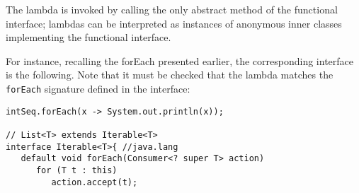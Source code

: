 The lambda is invoked by calling the only abstract method
of the functional interface;
lambdas can be interpreted as instances of anonymous
inner classes implementing the functional interface.

For instance, recalling the forEach presented earlier, the corresponding interface is the following.
Note that it must be checked that the lambda matches the \lstinline|forEach| signature defined in the interface:
\begin{lstlisting}
intSeq.forEach(x -> System.out.println(x));

// List<T> extends Iterable<T>
interface Iterable<T>{ //java.lang
   default void forEach(Consumer<? super T> action)
      for (T t : this)
         action.accept(t);
\end{lstlisting}